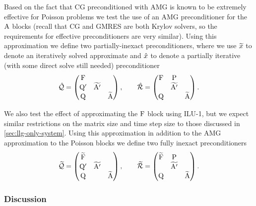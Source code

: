 Based on the fact that CG preconditioned with AMG is known to be extremely effective for Poisson problems we test the use of an AMG preconditioner for the $\mathrm{A}$ blocks (recall that CG and GMRES are both Krylov solvers, so the requirements for effective preconditioners are very similar).
Using this approximation we define two partially-inexact preconditioners, where we use $\widetilde{x}$ to denote an iteratively solved approximate and $\hat{x}$ to denote a partially iterative (\ie with some direct solve still needed) preconditioner
\begin{equation}
  \hat{\mathcal{Q}} = 
  \begin{pmatrix}
    \mathrm{F}       &           &  \\
    \mathrm{Q}'       & \widetilde{\mathrm{A}'} &   \\
    \mathrm{Q}       &           &   \widetilde{\mathrm{A}}
  \end{pmatrix},
  \qquad
  \hat{\mathcal{R}} = 
  \begin{pmatrix}
    \mathrm{F}       & \mathrm{P}       &  \\
    & \widetilde{\mathrm{A}'} &   \\
    \mathrm{Q}       &           &  \widetilde{\mathrm{A}}
  \end{pmatrix}.
  \label{eq:ms-block-prec-drop-p}
\end{equation}

We also test the effect of approximating the $\mathrm{F}$ block using ILU-1, but we expect similar restrictions on the matrix size and time step size to those discussed in \cref{sec:llg-only-system}.
Using this approximation in addition to the AMG approximation to the Poisson blocks we define two fully inexact preconditioners
\begin{equation}
  \widetilde{\mathcal{Q}} = 
  \begin{pmatrix}
    \widetilde{\mathrm{F}} &           &  \\
    \mathrm{Q}'       & \widetilde{\mathrm{A}'} &   \\
    \mathrm{Q}       &           &   \widetilde{\mathrm{A}}
  \end{pmatrix},
  \qquad
  \widetilde{\mathcal{R}} = 
  \begin{pmatrix}
   \widetilde{\mathrm{F}}       & \mathrm{P}       &  \\
    & \widetilde{\mathrm{A}'} &   \\
    \mathrm{Q}       &           &  \widetilde{\mathrm{A}}
  \end{pmatrix}.
  \label{eq:ms-block-prec-drop-p}
\end{equation}


\subsubsection{Discussion}


